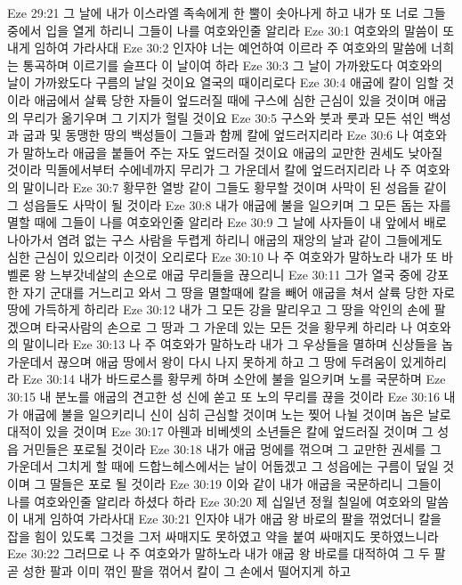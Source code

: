 Eze 29:21  그 날에 내가 이스라엘 족속에게 한 뿔이 솟아나게 하고 내가 또 너로 그들 중에서 입을 열게 하리니 그들이 나를 여호와인줄 알리라
Eze 30:1  여호와의 말씀이 또 내게 임하여 가라사대
Eze 30:2  인자야 너는 예언하여 이르라 주 여호와의 말씀에 너희는 통곡하며 이르기를 슬프다 이 날이여 하라
Eze 30:3  그 날이 가까왔도다 여호와의 날이 가까왔도다 구름의 날일 것이요 열국의 때이리로다
Eze 30:4  애굽에 칼이 임할 것이라 애굽에서 살륙 당한 자들이 엎드러질 때에 구스에 심한 근심이 있을 것이며 애굽의 무리가 옮기우며 그 기지가 헐릴 것이요
Eze 30:5  구스와 붓과 룻과 모든 섞인 백성과 굽과 및 동맹한 땅의 백성들이 그들과 함께 칼에 엎드러지리라
Eze 30:6  나 여호와가 말하노라 애굽을 붙들어 주는 자도 엎드러질 것이요 애굽의 교만한 권세도 낮아질 것이라 믹돌에서부터 수에네까지 무리가 그 가운데서 칼에 엎드러지리라 나 주 여호와의 말이니라
Eze 30:7  황무한 열방 같이 그들도 황무할 것이며 사막이 된 성읍들 같이 그 성읍들도 사막이 될 것이라
Eze 30:8  내가 애굽에 불을 일으키며 그 모든 돕는 자를 멸할 때에 그들이 나를 여호와인줄 알리라
Eze 30:9  그 날에 사자들이 내 앞에서 배로 나아가서 염려 없는 구스 사람을 두렵게 하리니 애굽의 재앙의 날과 같이 그들에게도 심한 근심이 있으리라 이것이 오리로다
Eze 30:10  나 주 여호와가 말하노라 내가 또 바벨론 왕 느부갓네살의 손으로 애굽 무리들을 끊으리니
Eze 30:11  그가 열국 중에 강포한 자기 군대를 거느리고 와서 그 땅을 멸할때에 칼을 빼어 애굽을 쳐서 살륙 당한 자로 땅에 가득하게 하리라
Eze 30:12  내가 그 모든 강을 말리우고 그 땅을 악인의 손에 팔겠으며 타국사람의 손으로 그 땅과 그 가운데 있는 모든 것을 황무케 하리라 나 여호와의 말이니라
Eze 30:13  나 주 여호와가 말하노라 내가 그 우상들을 멸하며 신상들을 놉 가운데서 끊으며 애굽 땅에서 왕이 다시 나지 못하게 하고 그 땅에 두려움이 있게하리라
Eze 30:14  내가 바드로스를 황무케 하며 소안에 불을 일으키며 노를 국문하며
Eze 30:15  내 분노를 애굽의 견고한 성 신에 쏟고 또 노의 무리를 끊을 것이라
Eze 30:16  내가 애굽에 불을 일으키리니 신이 심히 근심할 것이며 노는 찢어 나뉠 것이며 놉은 날로 대적이 있을 것이며
Eze 30:17  아웬과 비베셋의 소년들은 칼에 엎드러질 것이며 그 성읍 거민들은 포로될 것이라
Eze 30:18  내가 애굽 멍에를 꺾으며 그 교만한 권세를 그 가운데서 그치게 할 때에 드합느헤스에서는 날이 어둡겠고 그 성읍에는 구름이 덮일 것이며 그 딸들은 포로 될 것이라
Eze 30:19  이와 같이 내가 애굽을 국문하리니 그들이 나를 여호와인줄 알리라 하셨다 하라
Eze 30:20  제 십일년 정월 칠일에 여호와의 말씀이 내게 임하여 가라사대
Eze 30:21  인자야 내가 애굽 왕 바로의 팔을 꺾었더니 칼을 잡을 힘이 있도록 그것을 그저 싸매지도 못하였고 약을 붙여 싸매지도 못하였느니라
Eze 30:22  그러므로 나 주 여호와가 말하노라 내가 애굽 왕 바로를 대적하여 그 두 팔 곧 성한 팔과 이미 꺾인 팔을 꺾어서 칼이 그 손에서 떨어지게 하고
